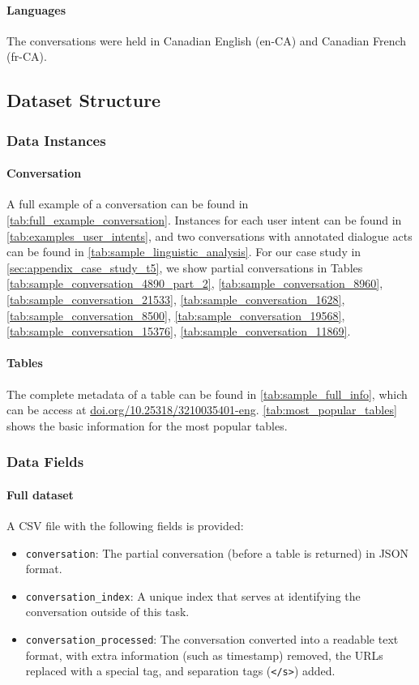 \documentclass[11pt]{article}
\begin{document}
\paragraph{Languages} The conversations were held in Canadian English (en-CA) and Canadian French (fr-CA).

\subsection{Dataset Structure}

\subsubsection{Data Instances}

\paragraph{Conversation} A full example of a conversation can be found in \autoref{tab:full_example_conversation}. Instances for each user intent can be found in \autoref{tab:examples_user_intents}, and two conversations with annotated dialogue acts can be found in \autoref{tab:sample_linguistic_analysis}. For our case study in \ref{sec:appendix_case_study_t5}, we show partial conversations in Tables \ref{tab:sample_conversation_4890_part_2}, \ref{tab:sample_conversation_8960}, \ref{tab:sample_conversation_21533}, \ref{tab:sample_conversation_1628}, \ref{tab:sample_conversation_8500}, \ref{tab:sample_conversation_19568}, \ref{tab:sample_conversation_15376}, \ref{tab:sample_conversation_11869}.

\paragraph{Tables} The complete metadata of a table can be found in \autoref{tab:sample_full_info}, which can be access at \href{https://doi.org/10.25318/3210035401-eng}{doi.org/10.25318/3210035401-eng}. \autoref{tab:most_popular_tables} shows the basic information for the most popular tables.

\subsubsection{Data Fields}

\paragraph{Full dataset} A CSV file with the following fields is provided:
\begin{itemize}
    \item \verb|conversation|: The partial conversation (before a table is returned) in JSON format.
    \item \verb|conversation_index|: A unique index that serves at identifying the conversation outside of this task.
    \item \verb|conversation_processed|: The conversation converted into a readable text format, with extra information (such as timestamp) removed, the URLs replaced with a special tag, and separation tags (\verb|</s>|) added.
\end{itemize}
\end{document}
